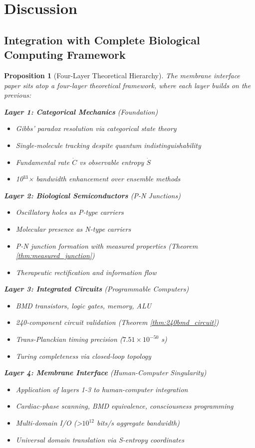 \documentclass[11pt,a4paper]{article}
\newtheorem{proposition}[theorem]{Proposition}
\theoremstyle{definition}
\theoremstyle{remark}
\begin{document}
\section{Discussion}

\subsection{Integration with Complete Biological Computing Framework}

\begin{proposition}[Four-Layer Theoretical Hierarchy]
The membrane interface paper sits atop a four-layer theoretical framework, where each layer builds on the previous:

\textbf{Layer 1: Categorical Mechanics} (Foundation)
\begin{itemize}
\item Gibbs' paradox resolution via categorical state theory
\item Single-molecule tracking despite quantum indistinguishability  
\item Fundamental rate $\dot{C}$ vs observable entropy $\dot{S}$
\item 10$^{33}$× bandwidth enhancement over ensemble methods
\end{itemize}

\textbf{Layer 2: Biological Semiconductors} (P-N Junctions)
\begin{itemize}
\item Oscillatory holes as P-type carriers
\item Molecular presence as N-type carriers
\item P-N junction formation with measured properties (Theorem \ref{thm:measured_junction})
\item Therapeutic rectification and information flow
\end{itemize}

\textbf{Layer 3: Integrated Circuits} (Programmable Computers)
\begin{itemize}
\item BMD transistors, logic gates, memory, ALU
\item 240-component circuit validation (Theorem \ref{thm:240bmd_circuit})
\item Trans-Planckian timing precision ($7.51 \times 10^{-50}$ s)
\item Turing completeness via closed-loop topology
\end{itemize}

\textbf{Layer 4: Membrane Interface} (Human-Computer Singularity)
\begin{itemize}
\item Application of layers 1-3 to human-computer integration
\item Cardiac-phase scanning, BMD equivalence, consciousness programming
\item Multi-domain I/O (>$10^{12}$ bits/s aggregate bandwidth)
\item Universal domain translation via S-entropy coordinates
\end{itemize}


\end{proposition}
\end{document}
